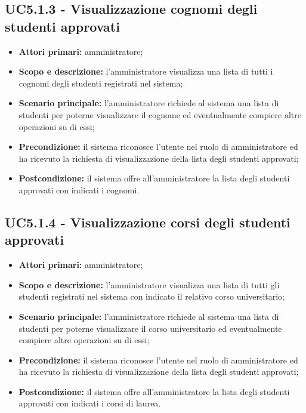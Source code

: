 \documentclass[AnalisiDeiRequisiti.tex]{subfiles}
\begin{document}
\subsection{UC5.1.3 - Visualizzazione cognomi degli studenti approvati}
\begin{itemize}
	\item \textbf{Attori primari:} amministratore;
	\item \textbf{Scopo e descrizione:} l'amministratore visualizza una lista di tutti i cognomi degli studenti registrati nel sistema;
	\item \textbf{Scenario principale:} l'amministratore richiede al sistema una lista di studenti per poterne visualizzare il cognome ed eventualmente compiere altre operazioni su di essi;
	\item \textbf{Precondizione:} il sistema riconosce l'utente nel ruolo di amministratore ed ha ricevuto la richiesta di visualizzazione della lista degli studenti approvati;
	\item \textbf{Postcondizione:} il sistema offre all'amministratore la lista degli studenti approvati con indicati i cognomi.
\end{itemize}
\subsection{UC5.1.4 - Visualizzazione corsi degli studenti approvati}
\begin{itemize}
	\item \textbf{Attori primari:} amministratore;
	\item \textbf{Scopo e descrizione:} l'amministratore visualizza una lista di tutti gli studenti registrati nel sistema con indicato il relativo corso universitario;
	\item \textbf{Scenario principale:} l'amministratore richiede al sistema una lista di studenti per poterne visualizzare il corso universitario ed eventualmente compiere altre operazioni su di essi;
	\item \textbf{Precondizione:} il sistema riconosce l'utente nel ruolo di amministratore ed ha ricevuto la richiesta di visualizzazione della lista degli studenti approvati;
	\item \textbf{Postcondizione:} il sistema offre all'amministratore la lista degli studenti approvati con indicati i corsi di laurea.
\end{itemize}
\end{document}
